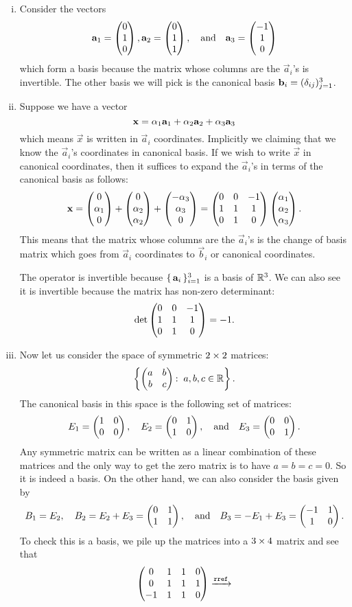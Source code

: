 \documentclass[12pt]{memoir}
\begin{document}
\begin{ptcbr}
    \begin{enumerate}[(i)]
        \item Consider the vectors 
        $$\mathbf{a}_1=\begin{pmatrix} 0 \\ 1 \\ 0 \end{pmatrix},\mathbf{a}_2=\begin{pmatrix} 0 \\ 1 \\ 1 \end{pmatrix},\quad\text{and}\quad\mathbf{a}_3=\begin{pmatrix} -1 \\ 1 \\ 0 \end{pmatrix}$$
        which form a basis because the matrix whose columns are the $\vec a_i$'s is invertible. The other basis we will pick is the canonical basis $\mathbf{b}_i=(\delta_{ij})_{j=1}^3$.
        \item Suppose we have a vector 
        $$\mathbf{x}=\alpha_1\mathbf{a}_1+\alpha_2\mathbf{a}_2+\alpha_3\mathbf{a}_3$$
        which means $\vec x$ is written in $\vec a_i$ coordinates. Implicitly we claiming that we know the $\vec a_i$'s coordinates in canonical basis. If we wish to write $\vec x$ in canonical coordinates, then it suffices to expand the $\vec a_i$'s in terms of the canonical basis as follows:
        $$\mathbf{x}=\begin{pmatrix} 0 \\ \alpha_1 \\ 0 \end{pmatrix}+\begin{pmatrix} 0 \\ \alpha_2 \\ \alpha_2 \end{pmatrix}+\begin{pmatrix} -\alpha_3 \\ \alpha_3 \\ 0 \end{pmatrix}=\begin{pmatrix} 0 & 0 & -1 \\ 1 & 1 & 1 \\ 0 & 1 & 0 \end{pmatrix}\begin{pmatrix} \alpha_1 \\ \alpha_2 \\ \alpha_3 \end{pmatrix}.$$
        This means that the matrix whose columns are the $\vec a_i$'s is the change of basis matrix which goes from $\vec a_i$ coordinates to $\vec b_i$ or canonical coordinates.\par 
        The operator is invertible because $\{\,\mathbf{a}_i\,\}_{i=1}^3$ is a basis of $\mathbb{R}^3$. We can also see it is invertible because the matrix has non-zero determinant:
        $$\det\begin{pmatrix} 0 & 0 & -1 \\ 1 & 1 & 1 \\ 0 & 1 & 0 \end{pmatrix}=-1.$$
        \item Now let us consider the space of symmetric $2\times2$ matrices:
        $$\left\lbrace\twobytwo{a}{b}{b}{c}\:\ a,b,c\in\bR\right\rbrace.$$
        The canonical basis in this space is the following set of matrices:
        $$E_1=\begin{pmatrix} 1 & 0 \\ 0 & 0 \end{pmatrix},\quad E_2=\begin{pmatrix} 0 & 1 \\ 1 & 0 \end{pmatrix},\quad\text{and}\quad E_3=\begin{pmatrix} 0 & 0 \\ 0 & 1 \end{pmatrix}.$$
        Any symmetric matrix can be written as a linear combination of these matrices and the only way to get the zero matrix is to have $a=b=c=0$. So it is indeed a basis. On the other hand, we can also consider the basis given by 
        $$B_1=E_2,\quad B_2=E_2+E_3=\begin{pmatrix} 0 & 1 \\ 1 & 1 \end{pmatrix},\quad\text{and}\quad B_3=-E_1+E_3=\begin{pmatrix} -1 & 1 \\ 1 & 0 \end{pmatrix}.$$
        To check this is a basis, we pile up the matrices into a $3\times4$ matrix and see that 
        $$\begin{pmatrix}
            0&1&1&0\\ 0&1&1&1\\-1&1&1&0
            \end{pmatrix}\xrightarrow[]{\texttt{rref}}
$$
\end{enumerate}
\end{ptcbr}
\end{document}
